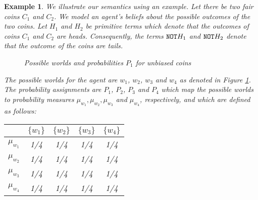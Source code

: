 \documentclass[12pt]{article}
\newtheorem{example}[theorem]{Example}
\begin{document}
\begin{example}{\em We illustrate our semantics using an example. Let there be two fair coins $C_1$ and $C_2$. We model an agent's beliefs about the possible outcomes of the two coins. Let $H_1$ and $H_2$ be primitive terms which denote that the outcomes of coins $C_1$ and $C_2$ are heads. Consequently, the terms $\mbox{\texttt{NOT}} H_1$ and $\mbox{\texttt{NOT}} H_2$ denote that the outcome of the coins are tails. 

\begin{figure}
\begin{center}
\caption{Possible worlds and probabilities $P_1$ for unbiased coins}
\label{fig:possiblew}
\end{center}
\end{figure}

The possible worlds for the agent are $w_1$, $w_2$, $w_3$ and $w_4$ as denoted in Figure \ref{fig:possiblew}. The probability assignments are $P_1$, $P_2$, $P_3$ and $P_4$ which map the possible worlds to probability measures $\mu_{w_1},\mu_{w_2},\mu_{w_3}$ and $\mu_{w_4}$, respectively, and which are defined as follows:\\

\begin{center}
\begin{tabular}{|c|c|c|c|c|}
\hline
&  $\{w_1\}$ &$\{w_2\}$ &$\{w_3\}$ & $\{w_4\}$\\ 
\hline
$\mu_{w_1}$& 1/4 & 1/4 & 1/4 &1/4\\ 
\hline
$\mu_{w_2}$& 1/4 & 1/4 & 1/4 &1/4\\ 
\hline
$\mu_{w_3}$& 1/4 & 1/4 & 1/4 &1/4\\ 
\hline
$\mu_{w_4}$& 1/4 & 1/4 & 1/4 &1/4\\ 
\hline
\end{tabular}
\end{center}

}
\end{example}
\end{document}
